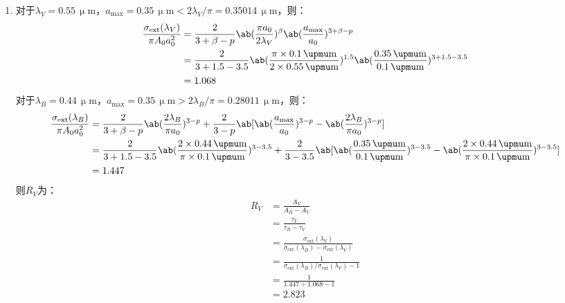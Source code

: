 \documentclass[a4paper,fontset=none]{ctexart}
\newcommand{\um}{\upmu\mathrm{m}}
\begin{document}
\begin{enumerate}
    \medskip
    \item[23.1 (e)]
    对于$\lambda_V = 0.55\,\um$，$a_{\mathrm{max}} = 0.35\,\um < 2\lambda_V/\pi = 0.35014\,\um$，则：
    \begin{align*}
        \frac{\sigma_{\mathrm{ext}}(\lambda_V)}{\pi A_0 a_0^2}
        &= \frac{2}{3 + \beta - p} \ab(\frac{\pi a_0}{2\lambda_V})^\beta \ab(\frac{a_{\mathrm{max}}}{a_0})^{3 + \beta - p} \\
        &= \frac{2}{3 + 1.5 - 3.5} \ab(\frac{\pi \times 0.1\,\um}{2 \times 0.55\,\um})^{1.5} \ab(\frac{0.35\,\um}{0.1\,\um})^{3 + 1.5 - 3.5} \\
        &= 1.068
    \end{align*}
    对于$\lambda_B = 0.44\,\um$，$a_{\mathrm{max}} = 0.35\,\um > 2\lambda_B/\pi = 0.28011\,\um$，则：
    \begin{align*}
        \frac{\sigma_{\mathrm{ext}}(\lambda_B)}{\pi A_0 a_0^2}
        &= \frac{2}{3 + \beta - p} \ab(\frac{2\lambda_B}{\pi a_0})^{3 - p} + \frac{2}{3 - p} \ab[\ab(\frac{a_{\mathrm{max}}}{a_0})^{3 - p} - \ab(\frac{2\lambda_B}{\pi a_0})^{3 - p}] \\
        &= \frac{2}{3 + 1.5 - 3.5} \ab(\frac{2 \times 0.44\,\um}{\pi \times 0.1\,\um})^{3 - 3.5} + \frac{2}{3 - 3.5} \ab[\ab(\frac{0.35\,\um}{0.1\,\um})^{3 - 3.5} - \ab(\frac{2 \times 0.44\,\um}{\pi \times 0.1\,\um})^{3 - 3.5}] \\
        &= 1.447
    \end{align*}
    则$R_V$为：
    \begin{align*}
        R_V
        &= \frac{A_V}{A_B - A_V} \\
        &= \frac{\tau_V}{\tau_B - \tau_V} \\
        &= \frac{\sigma_{\mathrm{ext}}(\lambda_V)}{\sigma_{\mathrm{ext}}(\lambda_B) - \sigma_{\mathrm{ext}}(\lambda_V)} \\
        &= \frac{1}{\sigma_{\mathrm{ext}}(\lambda_B) / \sigma_{\mathrm{ext}}(\lambda_V) - 1} \\
        &= \frac{1}{1.447 \div 1.068 - 1} \\
        &= 2.823
    \end{align*}

\end{enumerate}
\end{document}
